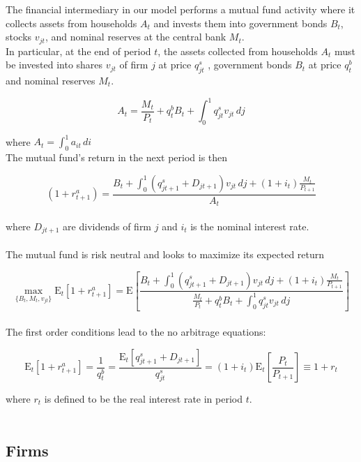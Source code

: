 \documentclass[titlepage]{\econtex}\providecommand{\texname}{BufferStockTheory}
\begin{document}
\label{subsec:Financial Intermediary}

The financial intermediary in our model performs a mutual fund activity where it  collects assets from households $A_{t}$ and invests them into government bonds $B_{t}$, stocks $v_{jt}$, and nominal reserves at the central bank $M_{t}$.\\ 

In particular, at the end of period $t$, the assets collected from households $A_{t}$ must be invested into shares $\mathit{v}_{jt}$ of firm $j$ at price  $q^{s}_{jt}$ , government bonds $B_{t}$ at price $q^{b}_{t}$ and nominal reserves $M_{t}$. 

$$A_{t} = \frac{M_{t}}{P_{t}} +q^{b}_{t} B_{t} + \int_{0}^{1} q^{s}_{jt}\mathit{v}_{jt}\,dj$$

where $A_{t} = \int_{0}^{1} a_{it} \, di$ \\

The mutual fund's return in the next period is then 

$$(1+r^{a}_{t+1})  = \frac{  B_{t} + \int_{0}^{1} (q^{s}_{jt+1}+ D_{jt+1})\mathit{v}_{jt} \, dj +(1+i_{t}) \frac{M_{t}}{P_{t+1}}}{A_{t}}$$\\ 

where  $D_{jt+1}$ are dividends of firm $j$ and $i_{t}$ is the nominal interest rate. \\ \\

The mutual fund is risk neutral and looks to maximize its expected return 


$$\max_{\{B_{t}, M_{t} , \mathit{v}_{jt} \}} \mathrm{E}_{t}\left[1+r^{a}_{t+1} \right] = \mathrm{E}\left[ \frac{ B_{t} + \int_{0}^{1} (q^{s}_{jt+1}+ D_{jt+1})\mathit{v}_{jt} \, dj +(1+i_{t}) \frac{M_{t}}{P_{t+1}}}{\frac{M_{t}}{P_{t}} +q^{b}_{t} B_{t} + \int_{0}^{1} q^{s}_{jt}\mathit{v}_{jt}\,dj} \right]$$ \\

 
The first order conditions lead to the no arbitrage equations:

$$ \mathrm{E}_{t}\left[1+r^{a}_{t+1}\right]= \frac{1}{q^{b}_{t}}  =\frac{\mathrm{E}_{t}\left[q^{s}_{jt+1} + D_{jt+1} \right]}{q^{s}_{jt}} = (1+i_{t}) \mathrm{E}_{t}\left[\frac{P_{t}}{P_{t+1}}\right] \equiv 1 +r_{t}$$

where $r_{t}$ is defined to be the real interest rate in period $t$.  \\ \\

\hypertarget{Firms}{}
\subsection{Firms}
\end{document}
